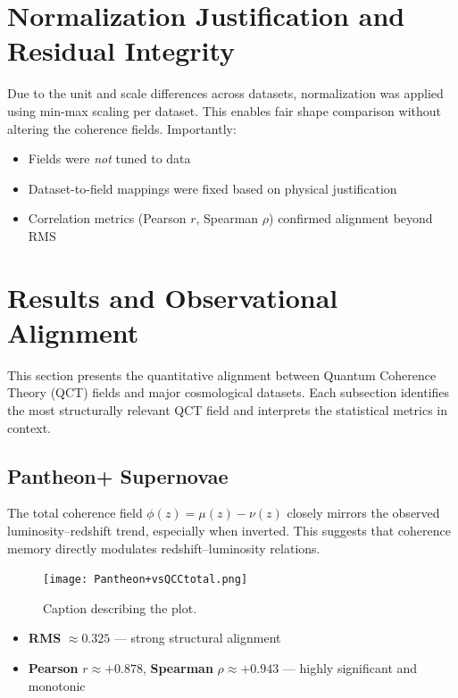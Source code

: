 \documentclass[12pt]{article}
\begin{document}
	\section{Normalization Justification and Residual Integrity}
	Due to the unit and scale differences across datasets, normalization was applied using min-max scaling per dataset. This enables fair shape comparison without altering the coherence fields. Importantly:
	\begin{itemize}
		\item Fields were \textit{not} tuned to data
		\item Dataset-to-field mappings were fixed based on physical justification
		\item Correlation metrics (Pearson \( r \), Spearman \( \rho \)) confirmed alignment beyond RMS
	\end{itemize}
	\section{Results and Observational Alignment}
	
	This section presents the quantitative alignment between Quantum Coherence Theory (QCT) fields and major cosmological datasets. Each subsection identifies the most structurally relevant QCT field and interprets the statistical metrics in context.
	
	\subsection*{Pantheon+ Supernovae}
	The total coherence field \( \phi(z) = \mu(z) - \nu(z) \) closely mirrors the observed luminosity–redshift trend, especially when inverted. This suggests that coherence memory directly modulates redshift–luminosity relations.
	
	\begin{figure}[htbp]
		\centering
		\texttt{[image: Pantheon+vsQCCtotal.png]}
		\caption{Caption describing the plot.}
		\label{fig:PantheonvsQCCtotal}
	\end{figure}
	
	\begin{itemize}
		\item \textbf{RMS} $\approx 0.325$ — strong structural alignment
		\item \textbf{Pearson} \( r \approx +0.878 \), \textbf{Spearman} \( \rho \approx +0.943 \) — highly significant and monotonic
	\end{itemize}
	
\end{document}
